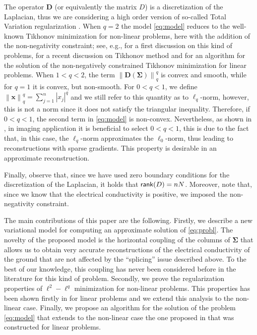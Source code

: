 \documentclass[final,leqno]{siamltex}
\newcommand{\ts}[1]{\mbox{\textsf{#1}}}
\newcommand{\norm}[1]{\left\| #1 \right\|}
\newcommand{\Sigmab}{\mathbf{\Sigma}}
\begin{document}
The operator $\mathbf{D}$ (or equivalently the matrix $D$) is a discretization of the Laplacian, thus we are considering a high order version of so-called Total Variation regularization \cite{ROF}. When $q=2$ the model \eqref{eq:model} reduces to the well-known Tikhonov minimization for non-linear problems, here with the addition of the non-negativity constraint; see, e.g., \cite{TS56} for a first discussion on this kind of problems, \cite{Engl,Hansen} for a recent discussion on Tikhonov method and \cite{BBHRYZ17} for an algorithm for the solution of the non-negatively constrained Tikhonov minimization for linear problems. When $1<q<2$, the term $\norm{\mathbf{D}(\mathbf{\Sigma})}_q^q$ is convex and smooth, while for $q=1$ it is convex, but non-smooth. For $0<q<1$, we define $\norm{\mathbf{x}}_q^q=\sum_{j=1}^{n}|x_j|^q$ and we still refer to this quantity as to $\ell_q$-norm, however, this is not a norm since it does not satisfy the triangular inequality. Therefore, if $0<q<1$, the second term in \eqref{eq:model} is non-convex. Nevertheless, as shown in \cite{HLMRS17,BR19,BDDMR20,BPR20,BR20,BR21}, in imaging application it is beneficial to select $0<q<1$, this is due to the fact that, in this case, the $\ell_q$-norm approximates the $\ell_0$-norm, thus leading to reconstructions with sparse gradients. This property is desirable in an approximate reconstruction.

Finally, observe that, since we have used zero boundary conditions for the discretization of the Laplacian, it holds that $\ts{rank}({D})=nN$. Moreover,  note that, since we know that the electrical conductivity is positive, we imposed the non-negativity constraint.

The main contributions of this paper are the following. Firstly, we describe a new variational model for computing an approximate solution of \eqref{eq:probl}. The novelty of the proposed model is the horizontal coupling of the columns of $\Sigmab$ that allows us to obtain very accurate reconstructions of the electrical conductivity of the ground that are not affected by the ``splicing'' issue described above. To the best of our knowledge, this coupling has never been considered before in the literature for this kind of problem. Secondly, we prove the regularization properties of $\ell^2-\ell^q$ minimization for non-linear problems. This properties has been shown firstly in \cite{BPR20} for linear problems and we extend this analysis to the non-linear case. Finally, we propose an algorithm for the solution of the problem \eqref{eq:model} that extends to the non-linear case the one proposed in \cite{HLMRS17} that was constructed for linear problems. 
\end{document}
